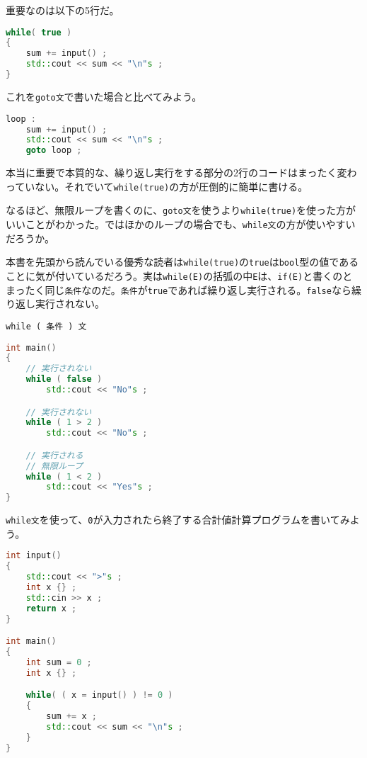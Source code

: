重要なのは以下の5行だ。

\begin{lstlisting}[language={C++}]
while( true )
{
    sum += input() ;
    std::cout << sum << "\n"s ;
}
\end{lstlisting}

これを\texttt{goto文}で書いた場合と比べてみよう。

\ifTombow\pagebreak\fi
\begin{lstlisting}[language={C++}]
loop :
    sum += input() ;
    std::cout << sum << "\n"s ;
    goto loop ;
\end{lstlisting}

本当に重要で本質的な、繰り返し実行をする部分の2行のコードはまったく変わっていない。それでいて\texttt{while(true)}の方が圧倒的に簡単に書ける。


なるほど、無限ループを書くのに、\texttt{goto文}を使うより\texttt{while(true)}を使った方がいいことがわかった。ではほかのループの場合でも、\texttt{while文}の方が使いやすいだろうか。

本書を先頭から読んでいる優秀な読者は\texttt{while(true)}の\texttt{true}は\texttt{bool}型の値であることに気が付いているだろう。実は\texttt{while(E)}の括弧の中\texttt{E}は、\texttt{if(E)}と書くのとまったく同じ\texttt{条件}なのだ。\texttt{条件}が\texttt{true}であれば繰り返し実行される。\texttt{false}なら繰り返し実行されない。

\begin{lstlisting}[style=grammar]
while ( 条件 ) 文
\end{lstlisting}

\begin{lstlisting}[language={C++}]
int main()
{
    // 実行されない
    while ( false )
        std::cout << "No"s ;

    // 実行されない
    while ( 1 > 2 )
        std::cout << "No"s ;

    // 実行される
    // 無限ループ
    while ( 1 < 2 )
        std::cout << "Yes"s ;
}
\end{lstlisting}

\texttt{while文}を使って、\texttt{0}が入力されたら終了する合計値計算プログラムを書いてみよう。

\begin{lstlisting}[language={C++}]
int input()
{
    std::cout << ">"s ;
    int x {} ;
    std::cin >> x ;
    return x ;
}

int main()
{
    int sum = 0 ;
    int x {} ;

    while( ( x = input() ) != 0 )
    {
        sum += x ;
        std::cout << sum << "\n"s ;
    }
}
\end{lstlisting}

